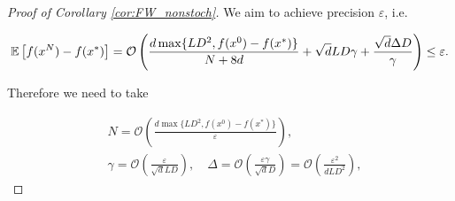     \begin{proof}[Proof of Corollary \ref{cor:FW_nonstoch}]
        We aim to achieve precision $\varepsilon$, i.e.

        \begin{equation*}
            \mathbb{E}\left[ f(x^{N}) - f(x^*) \right] 
            =
            \mathcal{O} \left( \frac{d \max\{L D^2, f(x^0) - f(x^*)\}}{N + 8d}
            + \sqrt{d} L D \gamma + \frac{\sqrt{d} \Delta D}{\gamma}\right) \leq \varepsilon.
        \end{equation*}

        Therefore we need to take

        \begin{equation*}
            \begin{split}
                &N = \mathcal{O} \left( \frac{d \max\{L D^2, f(x^0) - f(x^*)\}}{\varepsilon} \right),
                \\&\gamma = \mathcal{O} \left(\frac{\varepsilon}{\sqrt{d} L D} \right), \quad
                \Delta = \mathcal{O} \left( \frac{\varepsilon \gamma}{\sqrt{d} D}\right) = \mathcal{O} \left( \frac{\varepsilon^2}{d L D^2}\right),
            \end{split}
            \end{equation*}
        
    \end{proof}
    

